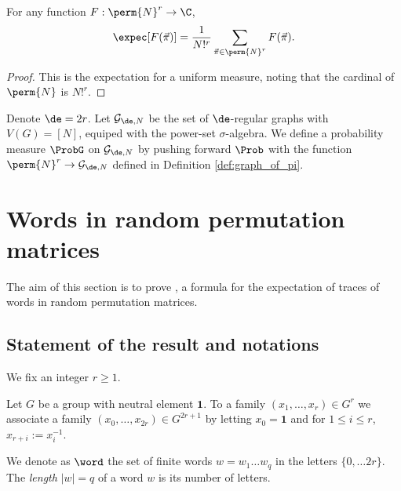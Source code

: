 \begin{lemma}
  \label{lem:formula_expec}
  For any function $F : \perm{N}^r \rightarrow \C$,
  \begin{equation*}
    \expec [F(\vec{\pi})] = \frac{1}{N!^r} \sum_{\vec{\pi} \in \perm{N}^r} F(\vec{\pi}).
  \end{equation*}
\end{lemma}

\begin{proof}
  This is the expectation for a uniform measure, noting that the cardinal of $\perm{N}$
  is $N!^r$.
\end{proof}

\begin{definition}
  \label{def:proba_on_graphs}
  Denote $\de = 2r$.
  Let $\mathcal{G}_{\de,N}$ be the set of $\de$-regular graphs with $V(G) = [N]$,
  equiped with the power-set $\sigma$-algebra.
  We define a probability measure $\ProbG$ on $\mathcal{G}_{\de,N}$ by pushing forward $\Prob$
  with the function
  $\perm{N}^r \rightarrow \mathcal{G}_{\de,N}$ defined in Definition \ref{def:graph_of_pi}.
\end{definition}

\section{Words in random permutation matrices}

The aim of this section is to prove \cite[Lemma 5.1]{chen2025}, a formula for the expectation
of traces of words in random permutation matrices.

\subsection{Statement of the result and notations}

We fix an integer $r \geq 1$.

\begin{definition}
  \label{def:numbering_convention}
  Let $G$ be a group with neutral element $\mathbf{1}$.
  To a family $(x_1, \ldots, x_r) \in G^r$ we associate a family $(x_0, \ldots, x_{2r}) \in G^{2r+1}$
  by letting $x_0= \mathbf{1}$ and for $1 \leq i \leq r$, $x_{r+i} := x_i^{-1}$.
\end{definition}

\begin{definition}
  \label{def:word}
  We denote as $\word$ the set of finite words $w = w_1 \ldots w_q$
  in the letters $\{0, \ldots 2r\}$.
  The \emph{length} $|w| = q$ of a word $w$ is its number of letters.
\end{definition}

